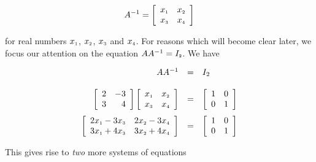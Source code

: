 \[  A^{-1} = \left[ \begin{array}{rr} x_{\mbox{\tiny$1$}} & x_{\mbox{\tiny$2$}} \\ x_{\mbox{\tiny$3$}} & x_{\mbox{\tiny$4$}} \\ \end{array} \right]\]

for real numbers $x_{\mbox{\tiny$1$}}$, $x_{\mbox{\tiny$2$}}$, $x_{\mbox{\tiny$3$}}$ and $x_{\mbox{\tiny$4$}}$.  For reasons which will become clear later, we focus our attention on the equation $AA^{-1} = I_{\mbox{\tiny$2$}}$.  We have

\[\begin{array}{rcl}

AA^{-1} & = & I_{2} \\ [13pt]

\left[ \begin{array}{rr} 2 & -3 \\ 3 & 4 \\ \end{array} \right] \left[ \begin{array}{rr} x_{\mbox{\tiny$1$}} & x_{\mbox{\tiny$2$}} \\ x_{\mbox{\tiny$3$}} & x_{\mbox{\tiny$4$}} \\ \end{array} \right]  & = & \left[ \begin{array}{rr} 1 & 0 \\ 0 & 1 \\ \end{array} \right] \\ [13pt]

\left[ \begin{array}{rr} 2x_{\mbox{\tiny$1$}} - 3x_{\mbox{\tiny$3$}} &  2x_{\mbox{\tiny$2$}} - 3x_{\mbox{\tiny$4$}} \\ 3x_{\mbox{\tiny$1$}} +4x_{\mbox{\tiny$3$}} &  3x_{\mbox{\tiny$2$}} +4x_{\mbox{\tiny$4$}} \\ \end{array} \right]  & = & \left[ \begin{array}{rr} 1 & 0 \\ 0 & 1 \\ \end{array} \right] \\

\end{array} \] 

This gives rise to \textit{two} more systems of equations

